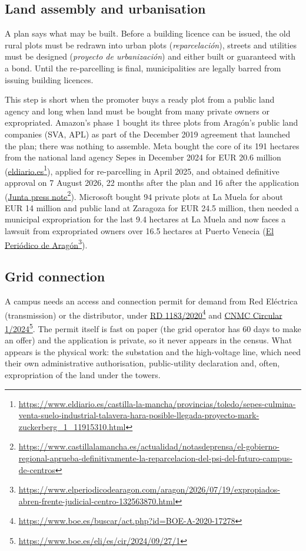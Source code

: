 \documentclass[11pt]{article}
\newcommand{\src}[2]{\href{#1}{#2}\footnote{\url{#1}}}
\begin{document}
\subsection{Land assembly and urbanisation}

A plan says what may be built. Before a building licence can be issued, the old rural plots must be redrawn into urban plots (\emph{reparcelación}), streets and utilities must be designed (\emph{proyecto de urbanización}) and either built or guaranteed with a bond. Until the re-parcelling is final, municipalities are legally barred from issuing building licences.

This step is short when the promoter buys a ready plot from a public land agency and long when land must be bought from many private owners or expropriated. Amazon's phase 1 bought its three plots from Aragón's public land companies (SVA, APL) as part of the December 2019 agreement that launched the plan; there was nothing to assemble. Meta bought the core of its 191 hectares from the national land agency Sepes in December 2024 for EUR 20.6 million (\src{https://www.eldiario.es/castilla-la-mancha/provincias/toledo/sepes-culmina-venta-suelo-industrial-talavera-hara-posible-llegada-proyecto-mark-zuckerberg_1_11915310.html}{eldiario.es}), applied for re-parcelling in April 2025, and obtained definitive approval on 7 August 2026, 22 months after the plan and 16 after the application (\src{https://www.castillalamancha.es/actualidad/notasdeprensa/el-gobierno-regional-aprueba-definitivamente-la-reparcelacion-del-psi-del-futuro-campus-de-centros}{Junta press note}). Microsoft bought 94 private plots at La Muela for about EUR 14 million and public land at Zaragoza for EUR 24.5 million, then needed a municipal expropriation for the last 9.4 hectares at La Muela and now faces a lawsuit from expropriated owners over 16.5 hectares at Puerto Venecia (\src{https://www.elperiodicodearagon.com/aragon/2026/07/19/expropiados-abren-frente-judicial-centro-132563870.html}{El Periódico de Aragón}).

\subsection{Grid connection}

A campus needs an access and connection permit for demand from Red Eléctrica (transmission) or the distributor, under \src{https://www.boe.es/buscar/act.php?id=BOE-A-2020-17278}{RD 1183/2020} and \src{https://www.boe.es/eli/es/cir/2024/09/27/1}{CNMC Circular 1/2024}. The permit itself is fast on paper (the grid operator has 60 days to make an offer) and the application is private, so it never appears in the census. What appears is the physical work: the substation and the high-voltage line, which need their own administrative authorisation, public-utility declaration and, often, expropriation of the land under the towers.
\end{document}
